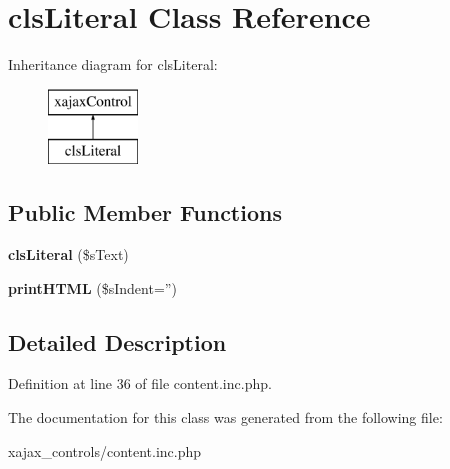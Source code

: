 \hypertarget{classclsLiteral}{
\section{clsLiteral Class Reference}
\label{classclsLiteral}
}
Inheritance diagram for clsLiteral:\begin{figure}[H]
\begin{center}
\leavevmode
\includegraphics[height=2.000000cm]{classclsLiteral}
\end{center}
\end{figure}
\subsection*{Public Member Functions}
\begin{DoxyCompactItemize}
\item 
\hypertarget{classclsLiteral_ac1725d0d31c4df644b8fa4cca85b1021}{
{\bfseries clsLiteral} (\$sText)}
\label{classclsLiteral_ac1725d0d31c4df644b8fa4cca85b1021}

\item 
\hypertarget{classclsLiteral_adc4db95171e62fdd7b34d5b613e728ca}{
{\bfseries printHTML} (\$sIndent='')}
\label{classclsLiteral_adc4db95171e62fdd7b34d5b613e728ca}

\end{DoxyCompactItemize}


\subsection{Detailed Description}


Definition at line 36 of file content.inc.php.



The documentation for this class was generated from the following file:\begin{DoxyCompactItemize}
\item 
xajax\_\-controls/content.inc.php\end{DoxyCompactItemize}
